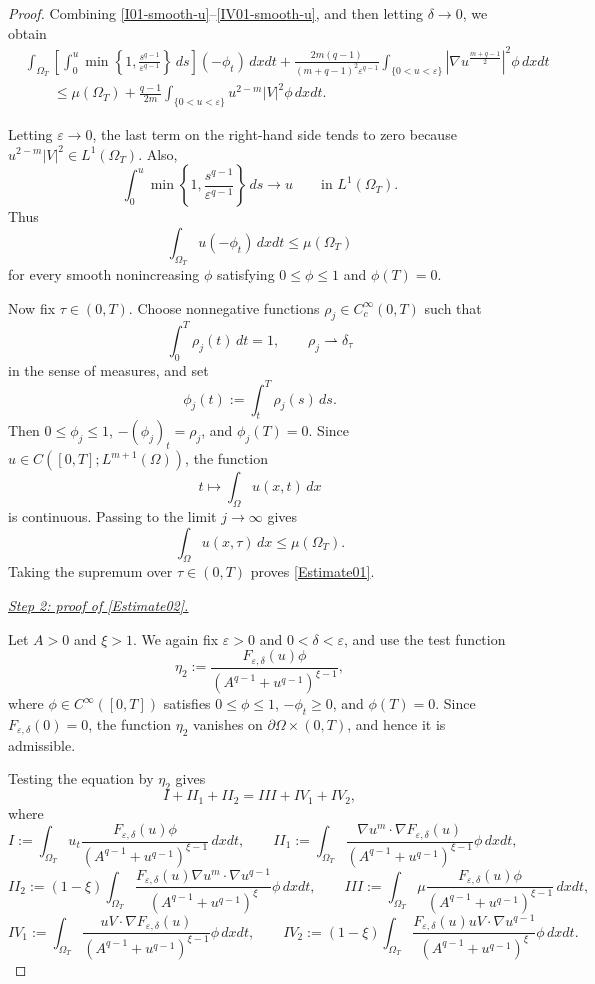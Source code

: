 \documentclass{amsart}
\numberwithin{equation}{section}
\begin{document}
\begin{proof}
Combining \eqref{I01-smooth-u}--\eqref{IV01-smooth-u}, and then letting
$\delta\to0$, we obtain
\begin{equation}\label{comp1-smooth-u}
\begin{aligned}
&\int_{\Omega_T}
\left[
\int_0^u
\min\left\{1,\frac{s^{q-1}}{\varepsilon^{q-1}}\right\}\,ds
\right]
(-\phi_t)\,dxdt
+
\frac{2m(q-1)}
{(m+q-1)^2\varepsilon^{q-1}}
\int_{\{0<u<\varepsilon\}}
\left|\nabla u^{\frac{m+q-1}{2}}\right|^2\phi\,dxdt  \\
&\qquad\le
\mu(\Omega_T)
+
\frac{q-1}{2m}
\int_{\{0<u<\varepsilon\}}
u^{2-m}|V|^2\phi\,dxdt.
\end{aligned}
\end{equation}

Letting $\varepsilon\to0$, the last term on the right-hand side tends to
zero because $u^{2-m}|V|^2\in L^1(\Omega_T)$. Also,
\[
\int_0^u
\min\left\{1,\frac{s^{q-1}}{\varepsilon^{q-1}}\right\}\,ds
\longrightarrow u
\qquad\text{in }L^1(\Omega_T).
\]
Thus
\[
\int_{\Omega_T}u(-\phi_t)\,dxdt
\le
\mu(\Omega_T)
\]
for every smooth nonincreasing $\phi$ satisfying
$0\le\phi\le1$ and $\phi(T)=0$.

Now fix $\tau\in(0,T)$. Choose nonnegative functions
$\rho_j\in C_c^\infty(0,T)$ such that
\[
\int_0^T\rho_j(t)\,dt=1,
\qquad
\rho_j\rightharpoonup\delta_\tau
\]
in the sense of measures, and set
\[
\phi_j(t):=\int_t^T\rho_j(s)\,ds.
\]
Then $0\le\phi_j\le1$, $-(\phi_j)_t=\rho_j$, and $\phi_j(T)=0$.
Since $u\in C([0,T];L^{m+1}(\Omega))$, the function
\[
t\mapsto\int_\Omega u(x,t)\,dx
\]
is continuous. Passing to the limit $j\to\infty$ gives
\[
\int_\Omega u(x,\tau)\,dx
\le
\mu(\Omega_T).
\]
Taking the supremum over $\tau\in(0,T)$ proves \eqref{Estimate01}.

\bigskip
\noindent
\underline{\emph{Step 2: proof of \eqref{Estimate02}.}}

Let $A>0$ and $\xi>1$. We again fix $\varepsilon>0$ and
$0<\delta<\varepsilon$, and use the test function
\[
\eta_2:=
\frac{F_{\varepsilon,\delta}(u)\phi}
{\left(A^{q-1}+u^{q-1}\right)^{\xi-1}},
\]
where $\phi\in C^\infty([0,T])$ satisfies $0\le\phi\le1$, $ -\phi_t\ge0$, and $\phi(T)=0$.
Since $F_{\varepsilon,\delta}(0)=0$, the function $\eta_2$ vanishes on
$\partial\Omega\times(0,T)$, and hence it is admissible.

Testing the equation by $\eta_2$ gives
\[
I+II_1+II_2=III+IV_1+IV_2,
\]
where
\[
I:=
\int_{\Omega_T}
u_t
\frac{F_{\varepsilon,\delta}(u)\phi}
{\left(A^{q-1}+u^{q-1}\right)^{\xi-1}}
\,dxdt,
\qquad
II_1:=
\int_{\Omega_T}
\frac{
\nabla u^m\cdot\nabla F_{\varepsilon,\delta}(u)
}
{\left(A^{q-1}+u^{q-1}\right)^{\xi-1}}
\phi\,dxdt,
\]
\[
II_2:=
(1-\xi)
\int_{\Omega_T}
\frac{
F_{\varepsilon,\delta}(u)
\nabla u^m\cdot\nabla u^{q-1}
}
{\left(A^{q-1}+u^{q-1}\right)^\xi}
\phi\,dxdt,
\qquad
III:=
\int_{\Omega_T}
\mu
\frac{F_{\varepsilon,\delta}(u)\phi}
{\left(A^{q-1}+u^{q-1}\right)^{\xi-1}}
\,dxdt,
\]
\[
IV_1:=
\int_{\Omega_T}
\frac{
uV\cdot\nabla F_{\varepsilon,\delta}(u)
}
{\left(A^{q-1}+u^{q-1}\right)^{\xi-1}}
\phi\,dxdt,
\qquad
IV_2:=
(1-\xi)
\int_{\Omega_T}
\frac{
F_{\varepsilon,\delta}(u)
uV\cdot\nabla u^{q-1}
}
{\left(A^{q-1}+u^{q-1}\right)^\xi}
\phi\,dxdt.
\]


\end{proof}
\end{document}
